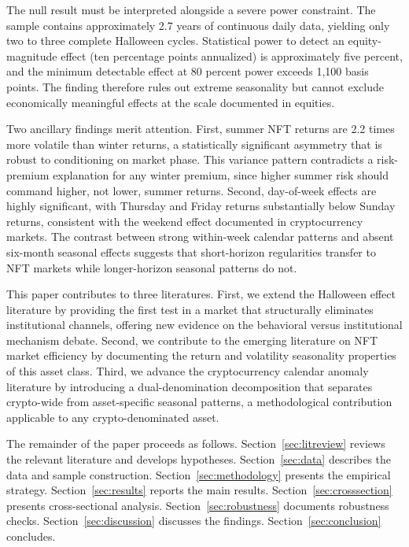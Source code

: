 \documentclass[12pt,a4paper]{article}
\begin{document}
The null result must be interpreted alongside a severe power constraint. The sample contains approximately 2.7 years of continuous daily data, yielding only two to three complete Halloween cycles. Statistical power to detect an equity-magnitude effect (ten percentage points annualized) is approximately five percent, and the minimum detectable effect at 80 percent power exceeds 1,100 basis points. The finding therefore rules out extreme seasonality but cannot exclude economically meaningful effects at the scale documented in equities.

Two ancillary findings merit attention. First, summer NFT returns are 2.2 times more volatile than winter returns, a statistically significant asymmetry that is robust to conditioning on market phase. This variance pattern contradicts a risk-premium explanation for any winter premium, since higher summer risk should command higher, not lower, summer returns. Second, day-of-week effects are highly significant, with Thursday and Friday returns substantially below Sunday returns, consistent with the weekend effect documented in cryptocurrency markets. The contrast between strong within-week calendar patterns and absent six-month seasonal effects suggests that short-horizon regularities transfer to NFT markets while longer-horizon seasonal patterns do not.

This paper contributes to three literatures. First, we extend the Halloween effect literature by providing the first test in a market that structurally eliminates institutional channels, offering new evidence on the behavioral versus institutional mechanism debate. Second, we contribute to the emerging literature on NFT market efficiency \citep{Dowling2022a,OzdemirKumar2023} by documenting the return and volatility seasonality properties of this asset class. Third, we advance the cryptocurrency calendar anomaly literature \citep{Kaiser2019,KinatederPapavassiliou2021,QadanAharonEichel2022} by introducing a dual-denomination decomposition that separates crypto-wide from asset-specific seasonal patterns, a methodological contribution applicable to any crypto-denominated asset.

The remainder of the paper proceeds as follows. Section~\ref{sec:litreview} reviews the relevant literature and develops hypotheses. Section~\ref{sec:data} describes the data and sample construction. Section~\ref{sec:methodology} presents the empirical strategy. Section~\ref{sec:results} reports the main results. Section~\ref{sec:crosssection} presents cross-sectional analysis. Section~\ref{sec:robustness} documents robustness checks. Section~\ref{sec:discussion} discusses the findings. Section~\ref{sec:conclusion} concludes.
\end{document}
